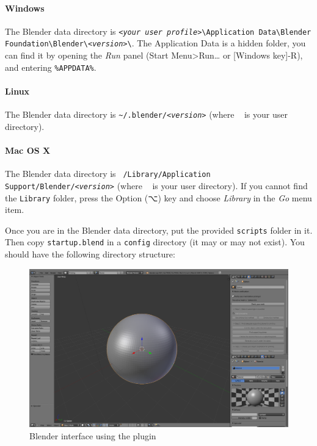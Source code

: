 \documentclass{article}
\begin{document}
	\paragraph{Windows} The Blender data directory is \texttt{\emph{<your user profile>}\textbackslash{}Application Data\textbackslash{}Blender Foundation\textbackslash{}Blender\textbackslash{}\emph{<version>}\textbackslash{}}. The Application Data is a hidden folder, you can find it by opening the \emph{Run} panel (Start Menu>Run… or [Windows key]-R), and entering \texttt{\%APPDATA\%}. 

	\paragraph{Linux} The Blender data directory is \texttt{\~ {}/.blender/\emph{<version>}} (where \texttt{~} is your user directory).
	
	\paragraph{Mac OS X} The Blender data directory is \texttt{~/Library/Application Support/Blender/\emph{<version>}} (where \texttt{~} is your user directory). If you cannot find the \texttt{Library} folder, press the Option (⌥) key and choose \emph{Library} in the \emph{Go} menu item.
	
	Once you are in the Blender data directory, put the provided \texttt{scripts} folder in it. Then copy \texttt{startup.blend} in a \texttt{config} directory (it may or may not exist). You should have the following directory structure:\\


	\begin{figure}[h!]
		\centering
		\includegraphics[width=\linewidth]{blender-plugin.png}
		\caption{Blender interface using the plugin}
	\end{figure}
\end{document}
